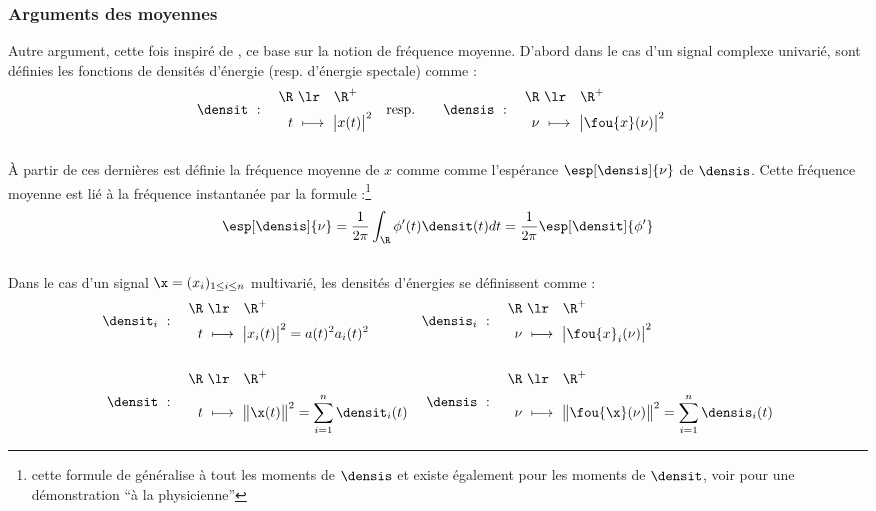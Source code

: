 \subsubsection*{Arguments des moyennes}

Autre argument, cette fois inspiré de \cite{cano_mathematical_2022}, ce base sur la notion de fréquence moyenne.
D'abord dans le cas d'un signal complexe univarié, sont définies les fonctions de densités d'énergie (resp. d'énergie spectale) comme :
\begin{align}\label{eq:densi_dE}
	\densit\ &:\quad \begin{aligned}\R\ &\lr\quad \R^+ \\ t\ &\longmapsto\ \big|x(t)\big|^2 \end{aligned}  
	&
	\text{resp.}\qquad \densis\ &:\quad \begin{aligned}\R\ &\lr\quad \R^+ \\ \nu\ &\longmapsto\ \big|\fou{x}(\nu)\big|^2 \end{aligned}
\end{align}
\\
À partir de ces dernières est définie la fréquence moyenne de $x$ comme comme l'espérance $\esp[\densis]{\nu}$ de $\densis$. Cette fréquence moyenne est lié à la fréquence instantanée par la formule :\footnote{cette formule de généralise à tout les moments de $\densis$ et existe également pour les moments de $\densit$, voir \cite[sec. 1.4]{cohen_time_1995} pour une démonstration ``à la physicienne'' }
\begin{equation}\label{eq:esp_freq}
	\esp[\densis]{\nu} = \frac{1}{2\pi}\int_\R \phi'(t)\densit(t)dt = \frac{1}{2\pi} \esp[\densit]{\phi'}
\end{equation}
\\
Dans le cas d'un signal $\x=(x_i)_{1\leq i\leq n}$ multivarié, les densités d'énergies se définissent comme :
\begin{align*}%
	\densit_i\ &:\quad \begin{aligned}\R\ &\lr\quad \R^+ \\ t\ &\longmapsto\ \big|x_i(t)\big|^2 = a(t)^2 a_i(t)^2 \end{aligned}  
	&
	\densis_i\ &:\quad \begin{aligned}\R\ &\lr\quad \R^+ \\ \nu\ &\longmapsto\ \big|\fou{x}_i(\nu)\big|^2 \end{aligned} \\ \\
	\densit\ &:\quad \begin{aligned}\R\ &\lr\quad \R^+ \\ t\ &\longmapsto\ \big\|\x(t)\big\|^2 = \sum_{i=1}^n \densit_i(t) \end{aligned}  
	&
	\densis\ &:\quad \begin{aligned}\R\ &\lr\quad \R^+ \\ \nu\ &\longmapsto\ \big\|\fou{\x}(\nu)\big\|^2 = \sum_{i=1}^n \densis_i(t) \end{aligned}	
\end{align*}
